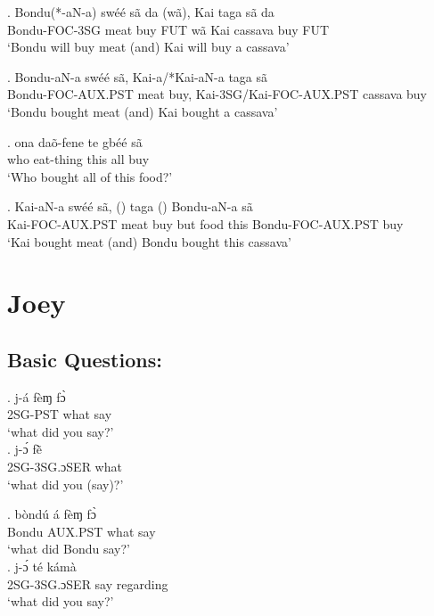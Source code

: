 \documentclass{assets/fieldnotes}
\begin{document}
\exg. Bondu(*-aN-a) swéé sã da (wã), Kai taga sã da\\
Bondu-FOC-3SG meat buy FUT wã Kai cassava buy FUT\\
`Bondu will buy meat (and) Kai will buy a cassava'\\

\exg. Bondu-aN-a swéé sã, Kai-a/*Kai-aN-a taga sã\\
Bondu-FOC-AUX.PST meat buy, Kai-3SG/Kai-FOC-AUX.PST cassava buy\\
`Bondu bought meat (and) Kai bought a cassava'

\exg. \textipa{\textltailn}ona daõ-fene te gbéé sã\\
who eat-thing this all buy\\
`Who bought all of this food?'

\exg. Kai-aN-a swéé sã, () taga () Bondu-aN-a sã\\
Kai-FOC-AUX.PST meat buy but food this Bondu-FOC-AUX.PST buy\\
`Kai bought meat (and) Bondu bought this cassava'



\section{Joey}

\subsection{Basic Questions:}

\exg. j-á fèɱ fɔ̀\\
2SG-PST what say\\
`what did you say?' \\

\exg. j-ɔ́ fẽ̀ \\
2SG-3SG.ɔSER what \\
`what did you (say)?' \\


\exg. bòndú á fèɱ fɔ̀\\
Bondu AUX.PST what say\\
`what did Bondu say?' \\

\exg. j-ɔ́ té kámà\\
2SG-3SG.ɔSER say regarding\\
`what did you say?' \\
\end{document}

